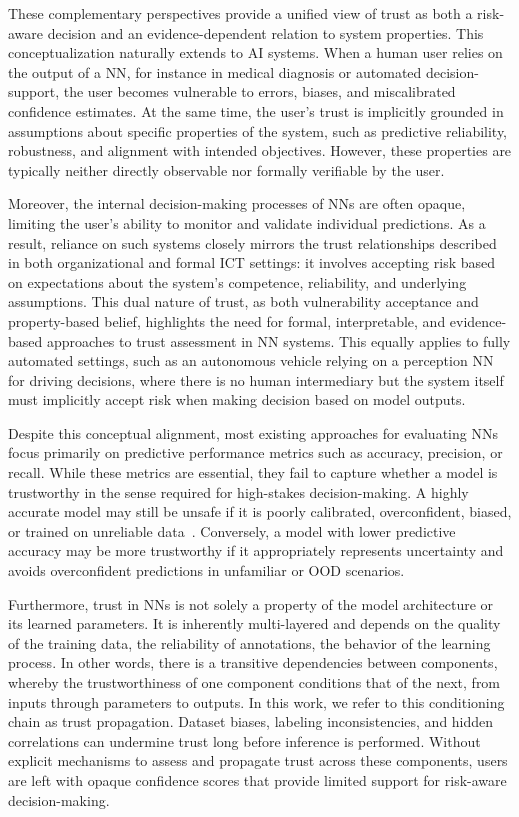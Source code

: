 These complementary perspectives provide a unified view of trust as both a risk-aware decision and an evidence-dependent relation to system properties. This conceptualization naturally extends to \ac{AI} systems. When a human user relies on the output of a \ac{NN}, for instance in medical diagnosis or automated decision-support, the user becomes vulnerable to errors, biases, and miscalibrated confidence estimates. At the same time, the user's trust is implicitly grounded in assumptions about specific properties of the system, such as predictive reliability, robustness, and alignment with intended objectives. However, these properties are typically neither directly observable nor formally verifiable by the user.

Moreover, the internal decision-making processes of \acp{NN} are often opaque, limiting the user's ability to monitor and validate individual predictions. As a result, reliance on such systems closely mirrors the trust relationships described in both organizational and formal \ac{ICT} settings: it involves accepting risk based on expectations about the system's competence, reliability, and underlying assumptions. This dual nature of trust, as both vulnerability acceptance and property-based belief, highlights the need for formal, interpretable, and evidence-based approaches to trust assessment in \ac{NN} systems. This equally applies to fully automated settings, such as an autonomous vehicle relying on a perception \ac{NN} for driving decisions, where there is no human intermediary but the system itself must implicitly accept risk when making decision based on model outputs.

Despite this conceptual alignment, most existing approaches for evaluating \acp{NN} focus primarily on predictive performance metrics such as accuracy, precision, or recall. While these metrics are essential, they fail to capture whether a model is trustworthy in the sense required for high-stakes decision-making. A highly accurate model may still be unsafe if it is poorly calibrated, overconfident, biased, or trained on unreliable data~\cite{ovadia2019trustmodelsuncertaintyevaluating, begoli2019need}. Conversely, a model with lower predictive accuracy may be more trustworthy if it appropriately represents uncertainty and avoids overconfident predictions in unfamiliar or \ac{OOD} scenarios. 

Furthermore, trust in \acp{NN} is not solely a property of the model architecture or its learned parameters. It is inherently multi-layered and depends on the quality of the training data, the reliability of annotations, the behavior of the learning process. In other words, there is a transitive dependencies between components, whereby the trustworthiness of one component conditions that of the next, from inputs through parameters to outputs. In this work, we refer to this conditioning chain as trust propagation. Dataset biases, labeling inconsistencies, and hidden correlations can undermine trust long before inference is performed. Without explicit mechanisms to assess and propagate trust across these components, users are left with opaque confidence scores that provide limited support for risk-aware decision-making.

